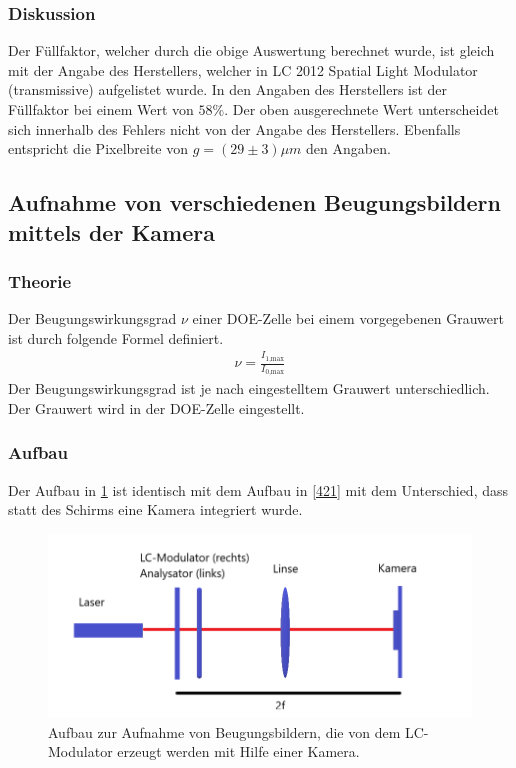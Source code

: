 \subsubsection{Diskussion}
Der Füllfaktor, welcher durch die obige Auswertung berechnet wurde, ist gleich mit der Angabe des Herstellers, welcher in LC 2012 Spatial Light Modulator (transmissive) aufgelistet wurde. In den Angaben des Herstellers ist der Füllfaktor bei einem Wert von $58 \%$. Der oben ausgerechnete Wert unterscheidet sich innerhalb des Fehlers nicht von der Angabe des Herstellers. Ebenfalls entspricht die Pixelbreite von $g = (29 \pm 3) \mu m$ den Angaben.

\subsection{Aufnahme von verschiedenen Beugungsbildern mittels der Kamera}
\subsubsection{Theorie}
Der Beugungswirkungsgrad $\nu$ einer DOE-Zelle bei einem vorgegebenen Grauwert ist durch folgende Formel definiert.
\begin{align}
	\nu = \frac{I_\text{1,max}}{I_\text{0,max}}
	\label{fff}
\end{align}
Der Beugungswirkungsgrad ist je nach eingestelltem Grauwert unterschiedlich. Der Grauwert wird in der DOE-Zelle eingestellt.
\subsubsection{Aufbau}
Der Aufbau in \cref{423} ist identisch mit dem Aufbau in \cref{421} mit dem Unterschied, dass statt des Schirms eine Kamera integriert wurde.
\begin{figure}[h!]
	\centering
	\includegraphics[scale = 1]{Kamera111.png}
	\caption{Aufbau zur Aufnahme von Beugungsbildern, die von dem LC-Modulator erzeugt werden mit Hilfe einer Kamera.}
	\label{423}
\end{figure}
